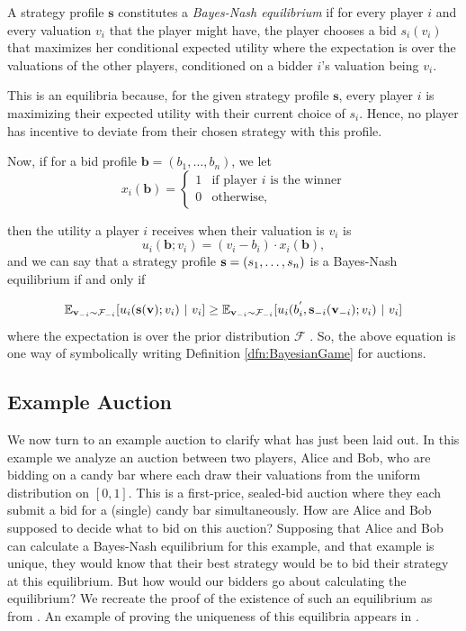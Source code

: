 \documentclass[12pt,twoside]{reedthesis}
\begin{document}
\begin{dfn}
	A strategy profile $\textbf{s}$ constitutes a {\em Bayes-Nash equilibrium} if for every player $i$ and every valuation $v_i$ that the player might have, the player chooses a bid $s_i(v_i)$ that maximizes her conditional expected utility where the expectation is over the valuations of the other players, conditioned on a bidder $i$'s valuation being $v_i$.
	\label{dfn:BayesNashEQ} 
\end{dfn}

This is an equilibria because, for the given strategy profile $\textbf{s}$, every player $i$ is maximizing their expected utility with their current choice of $s_i$. Hence, no player has incentive to deviate from their chosen strategy with this profile.
 
 Now, if for a bid profile $\textbf{b} = (b_1, \ldots, b_n)$, we let 
\[
	x_i(\textbf{b}) =
	\begin{cases}
		1 & \text{if player $i$ is the winner} \\
		0 & \text{otherwise},
	\end{cases}
\]

then the utility a player $i$ receives when their valuation is $v_i$ is 
$$u_i(\textbf{b}; v_i) = (v_i - b_i) \cdot x_i(\textbf{b}),$$ and we can say that a strategy profile $\textbf{s} = (s_1, \ldots, s_n)$ is a Bayes-Nash equilibrium if and only if


$$ \mathbb{E}_{\textbf{v}_{-i} \sim \mathcal{F}_{-i}} [u_i(\textbf{s} (\textbf{v}); v_i) \ | \ v_i] \geq \mathbb{E}_{\textbf{v}_{-i} \sim \mathcal{F}_{-i}} [u_i(b^{'}_i, \textbf{s}_{-i}(\textbf{v}_{-i}); v_i) \ | \ v_i] $$ where the expectation is over the prior distribution $\mathcal{F}$ \citep{Roughgarden2017}. So, the above equation is one way of symbolically writing Definition \ref{dfn:BayesianGame} for auctions.

\subsection{Example Auction}
We now turn to an example auction to clarify what has just been laid out. In this example we analyze an auction between two players, Alice and Bob, who are bidding on a candy bar where each draw their valuations from the uniform distribution on $[0,1]$. This is a first-price, sealed-bid auction where they each submit a bid for a (single) candy bar simultaneously. How are Alice and Bob supposed to decide what to bid on this auction? Supposing that Alice and Bob can calculate a Bayes-Nash equilibrium for this example, and that example is unique, they would know that their best strategy would be to bid their strategy at this equilibrium. But how would our bidders go about calculating the equilibrium? We recreate the proof of the existence of such an equilibrium as from \cite{Nisan2007}. An example of proving the uniqueness of this equilibria appears in \cite{Levin2002}.
\end{document}
